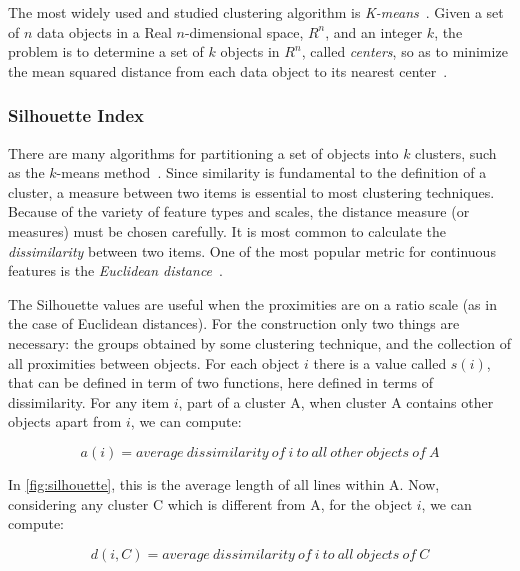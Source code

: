 \documentclass[conference,compsoc]{IEEEtran}
\begin{document}

The most widely used and studied clustering algorithm is \textit{K-means}~\cite{}. Given a set of $n$ data objects in a Real $n$-dimensional space, $R^n$, and an integer $k$, the problem is to determine a set of $k$ objects in $R^n$, called \textit{centers}, so as to minimize the mean squared distance from each data object to its nearest center~\cite{kanungo2002efficient}.


\subsubsection{Silhouette Index}
\label{sec:sillhouetteIndex}

There are many algorithms for partitioning a set of objects into $k$ clusters, such as the $k$-means method~\cite{kanungo2002efficient}. Since similarity is fundamental to the definition of a cluster, a measure between two items is essential to most clustering techniques. Because of the variety of feature types and scales, the distance measure (or measures) must be chosen carefully. It is most common to calculate the \textit{dissimilarity} between two items. One of the most popular metric for continuous features is the \textit{Euclidean distance}~\cite{jain1988algorithms}.

The Silhouette values are useful when the proximities are on a ratio scale (as in the case of Euclidean distances). For the construction only two things are necessary: the groups obtained by some clustering technique, and the collection of all proximities between objects. For each object $i$ there is a value called $s(i)$, that can be defined in term of two functions, here defined in terms of dissimilarity. For any item $i$, part of a cluster A, when cluster A contains other objects apart from $i$, we can compute:

\begin{equation} \label{eq:a_i}
a(i) = average~dissimilarity~of~i~to~all~other~objects~of~A
\end{equation}

In \ref{fig:silhouette}, this is the average length of all lines within A. Now, considering any cluster C which is different from A, for the object $i$, we can compute:

\begin{equation} \label{eq:d_i}
d(i, C) = average~dissimilarity~of~i~to~all~objects~of~C
\end{equation}
\end{document}
